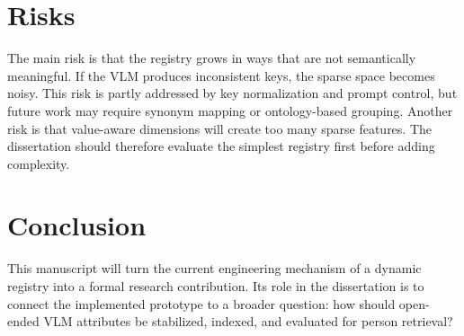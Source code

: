 \section{Risks}

The main risk is that the registry grows in ways that are not semantically meaningful. If the VLM produces inconsistent keys, the sparse space becomes noisy. This risk is partly addressed by key normalization and prompt control, but future work may require synonym mapping or ontology-based grouping. Another risk is that value-aware dimensions will create too many sparse features. The dissertation should therefore evaluate the simplest registry first before adding complexity.

\section{Conclusion}

This manuscript will turn the current engineering mechanism of a dynamic registry into a formal research contribution. Its role in the dissertation is to connect the implemented prototype to a broader question: how should open-ended VLM attributes be stabilized, indexed, and evaluated for person retrieval?
